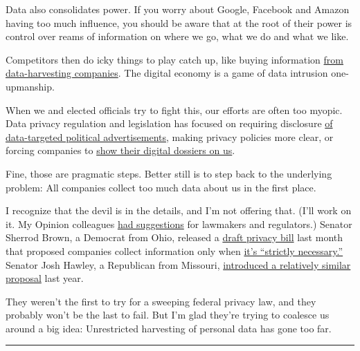 Data also consolidates power. If you worry about Google, Facebook and
Amazon having too much influence, you should be aware that at the root
of their power is control over reams of information on where we go, what
we do and what we like.

Competitors then do icky things to play catch up, like buying
information
\href{https://www.nytimes3xbfgragh.onion/interactive/2018/12/10/business/location-data-privacy-apps.html}{from
data-harvesting companies}. The digital economy is a game of data
intrusion one-upmanship.

When we and elected officials try to fight this, our efforts are often
too myopic. Data privacy regulation and legislation has focused on
requiring disclosure
\href{https://www.nytimes3xbfgragh.onion/2017/10/19/us/politics/facebook-google-russia-meddling-disclosure.html}{of
data-targeted political advertisements}, making privacy policies more
clear, or forcing companies to
\href{https://www.nytimes3xbfgragh.onion/2020/01/03/us/ccpa-california-privacy-law.html}{show
their digital dossiers on us}.

Fine, those are pragmatic steps. Better still is to step back to the
underlying problem: All companies collect too much data about us in the
first place.

I recognize that the devil is in the details, and I'm not offering that.
(I'll work on it. My Opinion colleagues
\href{https://www.nytimes3xbfgragh.onion/interactive/2019/12/21/opinion/location-data-privacy-rights.html}{had
suggestions} for lawmakers and regulators.) Senator Sherrod Brown, a
Democrat from Ohio, released a
\href{https://www.brown.senate.gov/newsroom/press/release/brown-proposal-protect-consumers-privacy}{draft
privacy bill} last month that proposed companies collect information
only when
\href{https://www.washingtonpost.com/technology/2020/06/18/data-privacy-law-sherrod-brown/}{it's
``strictly necessary.''} Senator Josh Hawley, a Republican from
Missouri,
\href{https://www.congress.gov/bill/116th-congress/senate-bill/1578/text}{introduced
a relatively similar proposal} last year.

They weren't the first to try for a sweeping federal privacy law, and
they probably won't be the last to fail. But I'm glad they're trying to
coalesce us around a big idea: Unrestricted harvesting of personal data
has gone too far.

\begin{center}\rule{0.5\linewidth}{\linethickness}\end{center}

